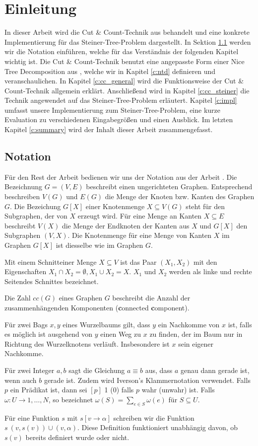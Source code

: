 \chapter{Einleitung}
\label{c:intro} %
In dieser Arbeit wird die Cut \& Count-Technik aus \cite{cygan_solving_2011} behandelt und eine konkrete Implementierung für das Steiner-Tree-Problem dargestellt. 
In Sektion \ref{sec:intro_not} werden wir die Notation einführen, welche für das Verständnis der folgenden Kapitel wichtig ist. Die Cut \& Count-Technik benutzt eine angepasste Form einer Nice Tree Decomposition aus \cite{kloks1994}, welche wir in Kapitel \ref{c:ntd} definieren und veranschaulichen.
In Kapitel \ref{c:cc_general} wird die Funktionsweise der Cut \& Count-Technik allgemein erklärt. 
Anschließend wird in Kapitel \ref{c:cc_steiner} die Technik angewendet auf das Steiner-Tree-Problem erläutert. 
Kapitel \ref{c:impl} umfasst unsere Implementierung zum Steiner-Tree-Problem, eine kurze Evaluation zu verschiedenen Eingabegrößen und einen Ausblick. 
Im letzten Kapitel \ref{c:summary} wird der Inhalt dieser Arbeit zusammengefasst.

\section{Notation}
\label{sec:intro_not}
Für den Rest der Arbeit bedienen wir uns der Notation aus der Arbeit \cite{cygan_solving_2011}. Die Bezeichnung $G=(V,E)$ beschreibt einen ungerichteten Graphen. Entsprechend beschreiben $V(G)$ und $E(G)$ die Menge der Knoten bzw. Kanten des Graphen $G$. Die Bezeichung $G[X]$ einer Knotenmenge $X \subseteq V(G)$ steht für den Subgraphen, der von $X$ erzeugt wird. Für eine Menge an Kanten $X \subseteq E$ beschreibt $V(X)$ die Menge der Endknoten der Kanten aus $X$ und $G[X]$ den Subgraphen $(V,X)$. Die Knotenmenge für eine Menge von Kanten $X$ im Graphen $G[X]$ ist diesselbe wie im Graphen $G$.

Mit einem \glqq Schnitt\grqq einer Menge $X \subseteq V$ ist das Paar $(X_1,X_2)$ mit den Eigenschaften $X_1 \cap X_2 = \emptyset,X_1 \cup X_2 = X$. $X_1$ und $X_2$ werden als linke und rechte \glqq Seiten\grqq des Schnittes bezeichnet.

Die Zahl $cc(G)$ eines Graphen $G$ beschreibt die Anzahl der zusammenhängenden Komponenten (\glqq \textbf{c}onnected \textbf{c}omponent\grqq).

Für zwei Bags $x,y$ eines Wurzelbaums gilt, dass $y$ ein Nachkomme von $x$ ist, falls es möglich ist ausgehend von $y$ einen Weg zu $x$ zu finden, der im Baum nur in Richtung des Wurzelknotens verläuft. Insbesondere ist $x$ sein eigener Nachkomme.

Für zwei Integer $a,b$ sagt die Gleichung $a \equiv b$ aus, dass $a$ genau dann gerade ist, wenn auch $b$ gerade ist.
Zudem wird Iverson's Klammernotation verwendet. Falls $p$ ein Prädikat ist, dann sei $[p]$ 1 (0) falls $p$ wahr (unwahr) ist.
Falls $\omega:U\rightarrow {1,\dots,N}$, so bezeichnet $\omega(S)=\sum_{e\in S} \omega(e)$ für $S \subseteq U$.

Für eine Funktion $s$ mit $s[v \rightarrow \alpha]$ schreiben wir die Funktion $s \ {(v,s(v))}\cup{(v,\alpha)}$. Diese Definition funktioniert unabhängig davon, ob $s(v)$ bereits definiert wurde oder nicht.
